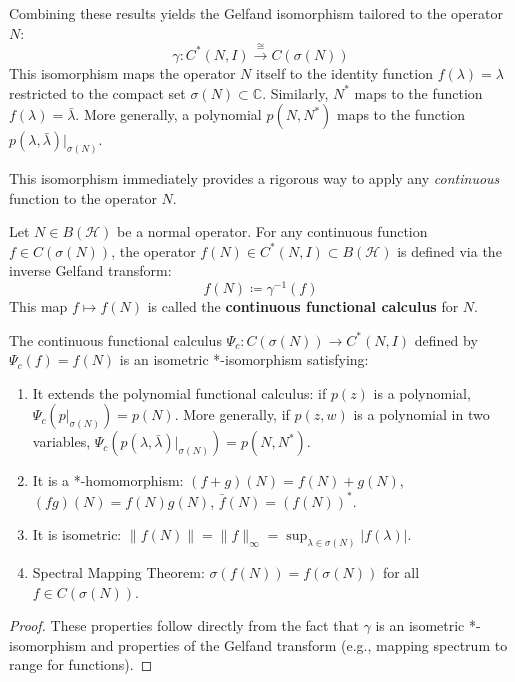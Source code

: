 Combining these results yields the Gelfand isomorphism tailored to the operator $N$:
\[ \gamma: C^*(N, I) \xrightarrow{\cong} C(\sigma(N)) \]
This isomorphism maps the operator $N$ itself to the identity function $f(\lambda) = \lambda$ restricted to the compact set $\sigma(N) \subset \mathbb{C}$. Similarly, $N^*$ maps to the function $f(\lambda) = \bar{\lambda}$. More generally, a polynomial $p(N, N^*)$ maps to the function $p(\lambda, \bar{\lambda})|_{\sigma(N)}$.

This isomorphism immediately provides a rigorous way to apply any \textit{continuous} function to the operator $N$.

\begin{definition}
\label{def:continuous_functional_calculus}
Let $N \in B(\mathcal{H})$ be a normal operator. For any continuous function $f \in C(\sigma(N))$, the operator $f(N) \in C^*(N, I) \subset B(\mathcal{H})$ is defined via the inverse Gelfand transform:
\[ f(N) \coloneqq \gamma^{-1}(f) \]
This map $f \mapsto f(N)$ is called the \textbf{continuous functional calculus} for $N$.
\end{definition}

\begin{theorem}
The continuous functional calculus $\Psi_c: C(\sigma(N)) \to C^*(N, I)$ defined by $\Psi_c(f) = f(N)$ is an isometric *-isomorphism satisfying:
\begin{enumerate}
    \item It extends the polynomial functional calculus: if $p(z)$ is a polynomial, $\Psi_c(p|_{\sigma(N)}) = p(N)$. More generally, if $p(z, w)$ is a polynomial in two variables, $\Psi_c(p(\lambda, \bar{\lambda})|_{\sigma(N)}) = p(N, N^*)$.
    \item It is a *-homomorphism: $(f+g)(N) = f(N)+g(N)$, $(fg)(N) = f(N)g(N)$, $\bar{f}(N) = (f(N))^*$.
    \item It is isometric: $\|f(N)\| = \|f\|_\infty = \sup_{\lambda \in \sigma(N)} |f(\lambda)|$.
    \item Spectral Mapping Theorem: $\sigma(f(N)) = f(\sigma(N))$ for all $f \in C(\sigma(N))$.
\end{enumerate}
\end{theorem}
\begin{proof}
These properties follow directly from the fact that $\gamma$ is an isometric *-isomorphism and properties of the Gelfand transform (e.g., mapping spectrum to range for functions).
\end{proof}

